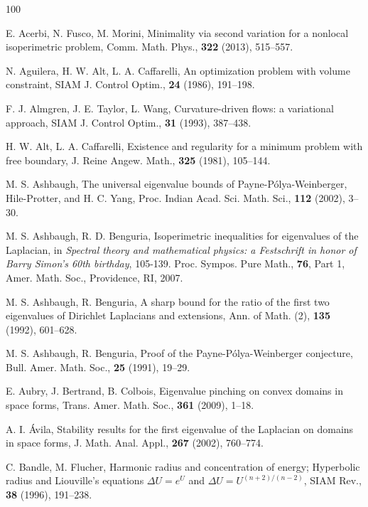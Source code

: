 \documentclass{amsart}
\theoremstyle{definition}
\numberwithin{equation}{section}
\begin{document}
\begin{thebibliography}{100}

 E. Acerbi, N. Fusco, M. Morini, Minimality via second variation for a nonlocal isoperimetric problem, Comm. Math. Phys., {\bf 322} (2013), 515--557.

 N. Aguilera, H. W. Alt, L. A. Caffarelli, An optimization problem with volume constraint, SIAM J. Control Optim., {\bf 24} (1986), 191--198.

 F. J. Almgren, J. E. Taylor, L. Wang, Curvature-driven flows: a variational approach, SIAM J. Control Optim., {\bf 31} (1993), 387--438.

 H. W. Alt, L. A. Caffarelli, Existence and regularity for a minimum problem with free boundary, J. Reine Angew. Math., {\bf 325} (1981), 105--144. 

 M. S. Ashbaugh, The universal eigenvalue bounds of Payne-P\'olya-Weinberger, Hile-Protter, and H. C. Yang, Proc. Indian Acad. Sci. Math. Sci., {\bf 112} (2002), 3--30. 

 M. S. Ashbaugh, R. D. Benguria, Isoperimetric inequalities for eigenvalues of the Laplacian, in {\it Spectral theory and mathematical physics: a Festschrift in honor of Barry Simon's 60th birthday}, 105-139. Proc. Sympos. Pure Math., {\bf 76}, Part 1, Amer. Math. Soc., Providence, RI, 2007.

 M. S. Ashbaugh, R. Benguria, A sharp bound for the ratio of the first two eigenvalues of Dirichlet Laplacians and extensions, Ann. of Math. (2), {\bf 135} (1992), 601--628.

 M. S. Ashbaugh, R. Benguria, Proof of the Payne-P\'olya-Weinberger conjecture, Bull. Amer. Math. Soc., {\bf 25} (1991), 19--29.

 E. Aubry, J. Bertrand, B. Colbois, Eigenvalue pinching on convex domains in space forms, Trans. Amer. Math. Soc., {\bf 361} (2009), 1--18. 

 A. I. \'Avila, Stability results for the first eigenvalue of the Laplacian on domains in space forms, J. Math. Anal. Appl., {\bf 267} (2002), 760--774.

 C. Bandle, M. Flucher, Harmonic radius and concentration of energy; Hyperbolic radius and Liouville's equations $\Delta U=e^U$ and $\Delta U=U^{(n+2)/(n-2)}$, SIAM Rev., {\bf 38} (1996), 191--238.


\end{thebibliography}
\end{document}
